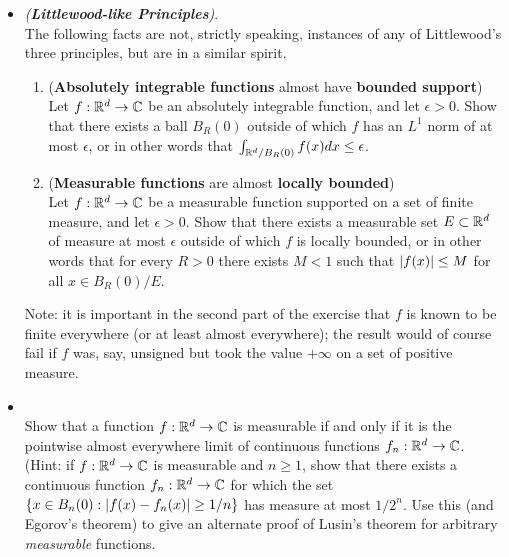 \documentclass[11pt]{article}
\begin{document}
\begin{itemize}
\item \begin{exercise} \emph{(\textbf{Littlewood-like Principles})}. \citep{tao2011introduction} \\
The following facts are not, strictly speaking, instances of any of Littlewood's three principles, but are in a similar spirit.
\begin{enumerate}
\item (\textbf{Absolutely integrable functions} almost have \textbf{bounded support})\\
Let $f : {\mathbb R}^d \rightarrow {\mathbb C}$ be an absolutely integrable function, and let $\epsilon > 0$. Show that there exists a ball $B_{R}(0)$ outside of which $f$ has an $L^1$ norm of at most $\epsilon$, or in other words that $\int_{{\mathbb R}^{d}/B_{R}(0)}f(x)dx \le \epsilon $.

\item (\textbf{Measurable functions} are almost \textbf{locally bounded})\\ 
Let $f : {\mathbb R}^d \rightarrow {\mathbb C}$ be a measurable function supported on a set of finite measure, and let $\epsilon > 0$. Show that there exists a measurable set $E \subset {\mathbb R}^d$ of measure at most $\epsilon$ outside of which $f$ is locally bounded, or in other words that for every $R > 0$ there exists $M < 1$ such that $\left\lvert f(x) \right\rvert \le M$ for all $x \in  B_{R}(0)/E$.
\end{enumerate}
\end{exercise}
Note: it is important in the second part of the exercise that $f$ is known to be finite everywhere (or at least almost everywhere); the result would of course fail if $f$ was, say, unsigned but took the value $+\infty$ on a set of positive measure.


\item \begin{exercise}\citep{tao2011introduction} \\
Show that a function $f : {\mathbb R}^d \rightarrow {\mathbb C}$ is measurable if and only if it is the pointwise almost everywhere limit of continuous functions $f_{n} : {\mathbb R}^d \rightarrow {\mathbb C}$. (Hint: if $f : {\mathbb R}^d \rightarrow {\mathbb C}$ is measurable and $n \ge 1$, show that there exists a continuous function $f_{n} : {\mathbb R}^d \rightarrow {\mathbb C}$ for which the set $\left\{x \in B_{n}(0) : \left\lvert f(x) - f_n(x) \right\rvert \ge 1/n\right\}$ has measure at most $1/2^{n}$. Use this (and Egorov's theorem) to give an alternate proof of Lusin's theorem for arbitrary \emph{measurable} functions.
\end{exercise}
\end{itemize}
\newpage


\end{document}
